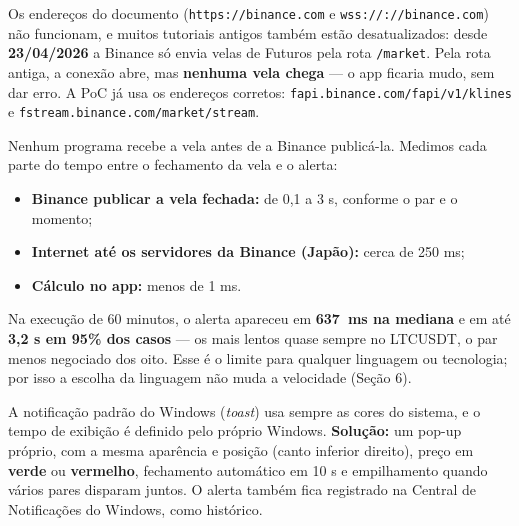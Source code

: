 \documentclass[11pt,a4paper]{article}
\newcommand{\icoBullet}{\textcolor{cyandk}{\ding{108}}}
\newcommand{\pocLatMed}{637}
\begin{document}
\begin{tcolorbox}[ajuste, title={4.2 \enspace Endereços da Binance mudaram em abril de 2026}]
  \small Os endereços do documento (\texttt{https://binance.com} e \texttt{wss://://binance.com})
  não funcionam, e muitos tutoriais antigos também estão desatualizados: desde
  \textbf{23/04/2026} a Binance só envia velas de Futuros pela rota \texttt{/market}. Pela rota
  antiga, a conexão abre, mas \textbf{nenhuma vela chega} --- o app ficaria mudo, sem dar erro.
  A PoC já usa os endereços corretos: \texttt{fapi.binance.com/fapi/v1/klines} e
  \texttt{fstream.binance.com/market/stream}.
\end{tcolorbox}

\begin{tcolorbox}[ajuste, title={4.3 \enspace ``Latência zero'': o que é fisicamente possível}]
  \small Nenhum programa recebe a vela antes de a Binance publicá-la. Medimos cada parte do tempo
  entre o fechamento da vela e o alerta:
  \begin{itemize}[leftmargin=1.4em, itemsep=1pt, topsep=2pt]
    \item[\icoBullet] \textbf{Binance publicar a vela fechada:} de 0,1 a 3 s, conforme o par e o momento;
    \item[\icoBullet] \textbf{Internet até os servidores da Binance (Japão):} cerca de 250 ms;
    \item[\icoBullet] \textbf{Cálculo no app:} menos de 1 ms.
  \end{itemize}
  Na execução de 60 minutos, o alerta apareceu em \textbf{\pocLatMed\ ms na mediana} e em até
  \textbf{3,2 s em 95\% dos casos} --- os mais lentos quase sempre no LTCUSDT, o par menos negociado
  dos oito. Esse é o limite para qualquer linguagem ou tecnologia; por isso a escolha da linguagem não
  muda a velocidade (Seção 6).
\end{tcolorbox}

\begin{tcolorbox}[ajuste, title={4.4 \enspace Notificação nativa do Windows não aceita cores nem 10 s exatos}]
  \small A notificação padrão do Windows (\emph{toast}) usa sempre as cores do sistema, e o tempo de
  exibição é definido pelo próprio Windows. \textbf{Solução:} um pop-up próprio, com a mesma
  aparência e posição (canto inferior direito), preço em \textbf{\textcolor{sinalW}{verde}} ou
  \textbf{\textcolor{sinalZ}{vermelho}}, fechamento automático em 10 s e empilhamento quando
  vários pares disparam juntos. O alerta também fica registrado na Central de Notificações do
  Windows, como histórico.
\end{tcolorbox}
\end{document}
